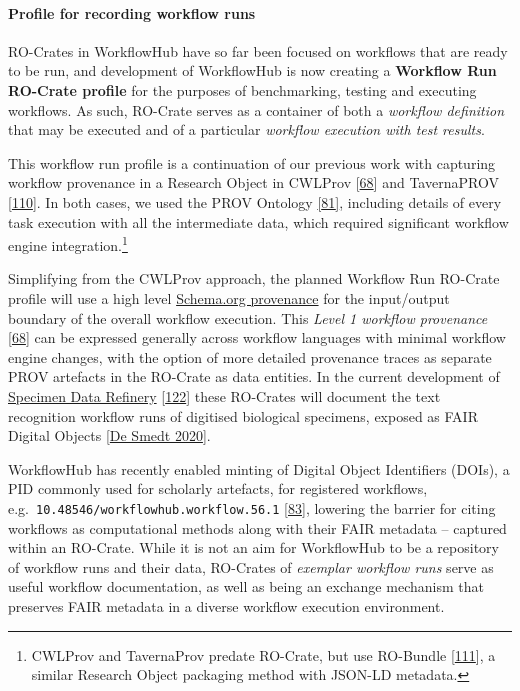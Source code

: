 \hypertarget{profile-for-recording-workflow-runs}{%
\paragraph{Profile for recording workflow
runs}\label{profile-for-recording-workflow-runs}}

RO-Crates in WorkflowHub have so far been focused on workflows that are
ready to be run, and development of WorkflowHub is now creating a
\textbf{Workflow Run RO-Crate profile} for the purposes of benchmarking,
testing and executing workflows. As such, RO-Crate serves as a container
of both a \emph{workflow definition} that may be executed and of a
particular \emph{workflow execution with test results}.

This workflow run profile is a continuation of our previous work with
capturing workflow provenance in a Research Object in CWLProv
{[}\href{https://doi.org/10.1093/gigascience/giz095}{68}{]} and
TavernaPROV {[}\href{https://s11.no/2016/provweek-tavernaprov/}{110}{]}.
In both cases, we used the PROV Ontology
\href{https://www.w3.org/TR/2013/REC-prov-o-20130430/}{{[}81{]}},
including details of every task execution with all the intermediate
data, which required significant workflow engine integration.\footnote{CWLProv
  and TavernaProv predate RO-Crate, but use RO-Bundle
  {[}\href{https://w3id.org/bundle/2014-11-05/}{111}{]}, a similar
  Research Object packaging method with JSON-LD metadata.}

Simplifying from the CWLProv approach, the planned Workflow Run RO-Crate
profile will use a high level
\href{https://www.researchobject.org/ro-crate/1.1/provenance.html\#software-used-to-create-files}{Schema.org
provenance} for the input/output boundary of the overall workflow
execution. This \emph{Level 1 workflow provenance}
{[}\href{https://doi.org/10.1093/gigascience/giz095}{68}{]} can be
expressed generally across workflow languages with minimal workflow
engine changes, with the option of more detailed provenance traces as
separate PROV artefacts in the RO-Crate as data entities. In the current
development of \href{https://github.com/DiSSCo/SDR}{Specimen Data
Refinery} {[}\href{https://doi.org/10.3897/rio.6.e57602}{122}{]} these
RO-Crates will document the text recognition workflow runs of digitised
biological specimens, exposed as FAIR Digital Objects
{[}\href{https://doi.org/10.3390/publications8020021}{De Smedt 2020}{]}.

WorkflowHub has recently enabled minting of Digital Object Identifiers
(DOIs), a PID commonly used for scholarly artefacts, for registered
workflows, e.g.~\texttt{10.48546/workflowhub.workflow.56.1}
{[}\href{https://doi.org/10.48546/workflowhub.workflow.56.1}{83}{]},
lowering the barrier for citing workflows as computational methods along
with their FAIR metadata -- captured within an RO-Crate. While it is not
an aim for WorkflowHub to be a repository of workflow runs and their
data, RO-Crates of \emph{exemplar workflow runs} serve as useful
workflow documentation, as well as being an exchange mechanism that
preserves FAIR metadata in a diverse workflow execution environment.

